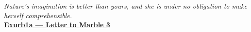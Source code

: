 \thispagestyle{empty}
{}

\vspace*{3cm}

\begin{flushright}
    {\Large
    \textit{Nature's imagination is better than yours, and she is under no obligation to make herself comprehensible.}
    }
    \\ \bigskip
    {\large
    \href{https://www.youtube.com/watch?v=0R7EN_GTAlw}{\textbf{Exurb1a --- Letter to Marble 3}}
    }

\end{flushright}

\newpage
\thispagestyle{empty}

